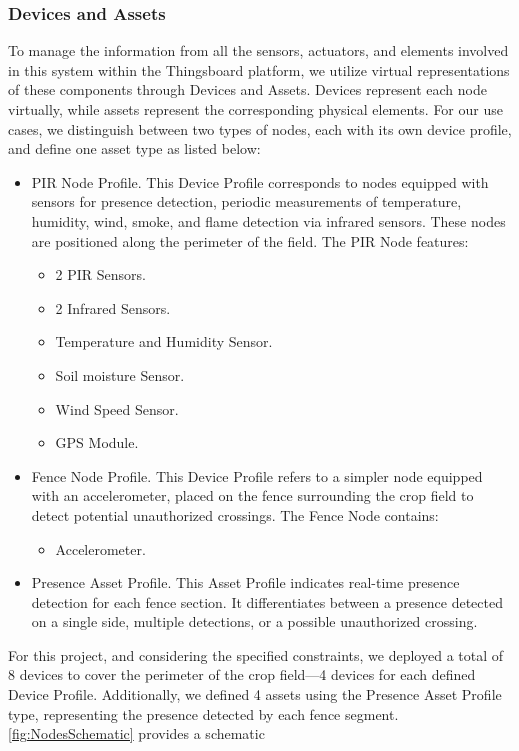 \subsubsection*{Devices and Assets}
To manage the information from all the sensors, actuators, and elements involved in this system within the Thingsboard platform, we utilize virtual representations of 
these components through Devices and Assets. Devices represent each node virtually, while assets represent the corresponding physical elements. For our use cases, we 
distinguish between two types of nodes, each with its own device profile, and define one asset type as listed below:
\begin{itemize}
    \item PIR Node Profile. This Device Profile corresponds to nodes equipped with sensors for presence detection, periodic measurements of temperature, humidity, 
    wind, smoke, and flame detection via infrared sensors. These nodes are positioned along the perimeter of the field. The PIR Node features:
    \begin{itemize}
        \item 2 PIR Sensors.
        \item 2 Infrared Sensors.
        \item Temperature and Humidity Sensor.
        \item Soil moisture Sensor.
        \item Wind Speed Sensor.
        \item GPS Module.
    \end{itemize}
    \item Fence Node Profile. This Device Profile refers to a simpler node equipped with an accelerometer, placed on the fence surrounding the crop field to detect 
    potential unauthorized crossings. The Fence Node contains:
    \begin{itemize}
        \item Accelerometer.
    \end{itemize}
    \item Presence Asset Profile. This Asset Profile indicates real-time presence detection for each fence section. It differentiates between a presence detected on 
    a single side, multiple detections, or a possible unauthorized crossing.
\end{itemize}
For this project, and considering the specified constraints, we deployed a total of 8 devices to cover the perimeter of the crop field—4 devices for each defined Device 
Profile. Additionally, we defined 4 assets using the Presence Asset Profile type, representing the presence detected by each fence segment. \autoref{fig:NodesSchematic} provides a schematic 
